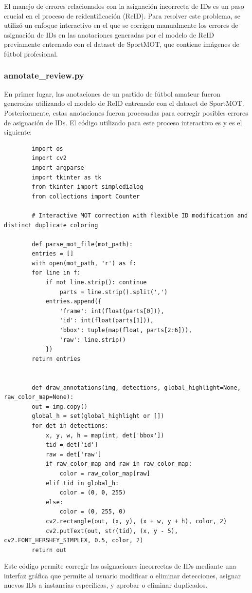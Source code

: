 \documentclass[12pt, a4paper, twoside]{article}
\begin{document}
	El manejo de errores relacionados con la asignación incorrecta de IDs es un paso crucial en el proceso de reidentificación (ReID). Para resolver este problema, se utilizó un enfoque interactivo en el que se corrigen manualmente los errores de asignación de IDs en las anotaciones generadas por el modelo de ReID previamente entrenado con el dataset de SportMOT, que contiene imágenes de fútbol profesional.
	
	\subsubsection{annotate\_review.py}
	
	En primer lugar, las anotaciones de un partido de fútbol amateur fueron generadas utilizando el modelo de ReID entrenado con el dataset de SportMOT. Posteriormente, estas anotaciones fueron procesadas para corregir posibles errores de asignación de IDs. El código utilizado para este proceso interactivo es  y es el siguiente:
	
	\begin{verbatim}
		import os
		import cv2
		import argparse
		import tkinter as tk
		from tkinter import simpledialog
		from collections import Counter
		
		# Interactive MOT correction with flexible ID modification and distinct duplicate coloring
		
		def parse_mot_file(mot_path):
		entries = []
		with open(mot_path, 'r') as f:
		for line in f:
			if not line.strip(): continue
				parts = line.strip().split(',')
			entries.append({
				'frame': int(float(parts[0])), 
				'id': int(float(parts[1])), 
				'bbox': tuple(map(float, parts[2:6])),
				'raw': line.strip()
			})
		return entries
		
		
		def draw_annotations(img, detections, global_highlight=None, raw_color_map=None):
		out = img.copy()
		global_h = set(global_highlight or [])
		for det in detections:
			x, y, w, h = map(int, det['bbox'])
			tid = det['id']
			raw = det['raw']
			if raw_color_map and raw in raw_color_map:
				color = raw_color_map[raw]
			elif tid in global_h:
				color = (0, 0, 255)
			else:
				color = (0, 255, 0)
			cv2.rectangle(out, (x, y), (x + w, y + h), color, 2)
			cv2.putText(out, str(tid), (x, y - 5), cv2.FONT_HERSHEY_SIMPLEX, 0.5, color, 2)
		return out
	\end{verbatim}
	
	Este código permite corregir las asignaciones incorrectas de IDs mediante una interfaz gráfica que permite al usuario modificar o eliminar detecciones, asignar nuevos IDs a instancias específicas, y aprobar o eliminar duplicados.
	
\end{document}
